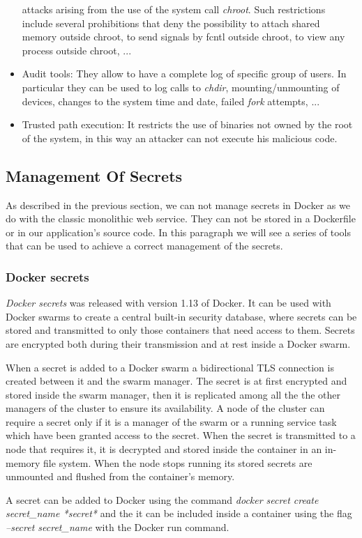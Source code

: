 \documentclass[a4paper,12pt]{article}
\begin{document}
\begin{itemize}
  attacks arising from the use of the system call \textit{chroot}. Such
  restrictions include several prohibitions that deny the possibility to
  attach shared memory outside chroot, to send signals by fcntl outside chroot,
  to view any process outside chroot, ...
  \item Audit tools: They allow to have a complete log of specific group of
  users. In particular they can be used to log calls to \textit{chdir},
  mounting/unmounting of devices, changes to the system time and date, failed
  \textit{fork} attempts, ...
  \item Trusted path execution: It restricts the use of binaries not owned by
  the root of the system, in this way an attacker can not execute his malicious
  code.
\end{itemize}

\subsection{Management Of Secrets}

As described in the previous section, we can not manage secrets in Docker as we
do with the classic monolithic web service. They can not be stored in a
Dockerfile or in our application's source code. In this paragraph we will see a
series of tools that can be used to achieve a correct management of the secrets.

\subsubsection{Docker secrets}

\textit{Docker secrets} \cite{docker_secrets} was released with version 1.13 of
Docker. It can be used with Docker swarms to create a central built-in security
database, where secrets can be stored and transmitted to only those containers
that need access to them. Secrets are encrypted both during their transmission
and at rest inside a Docker swarm. \par When a secret is added to a Docker swarm
a bidirectional TLS connection is created between it and the swarm manager. The
secret is at first encrypted and stored inside the swarm manager, then it is
replicated among all the the other managers of the cluster to ensure its
availability. A node of the cluster can require a secret only if it is a manager
of the swarm or a running service task which have been granted access to the
secret. When the secret is transmitted to a node that requires it, it is
decrypted and stored inside the container in an in-memory file system. When the
node stops running its stored secrets are unmounted and flushed from the
container's memory.\par A secret can be added to Docker using the command
\textit{docker secret create secret\_name *secret*} and the it can be included
inside a container using the flag \textit{--secret secret\_name} with the Docker
run command.
\end{document}

